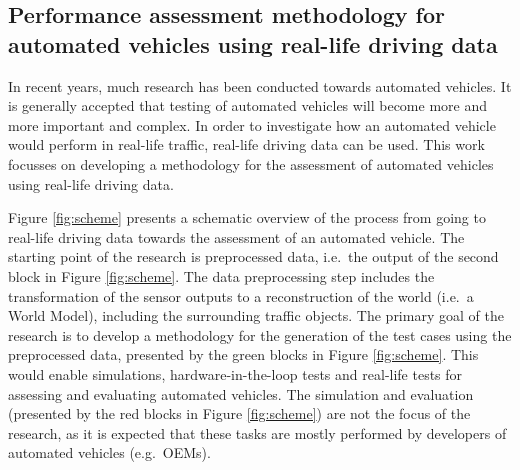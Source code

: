 \documentclass[10pt,final,a4paper,oneside,onecolumn]{article}
\begin{document}
\subsection*{Performance assessment methodology for automated vehicles using real-life driving data}

In recent years, much research has been conducted towards automated vehicles. It is generally accepted that testing of automated vehicles will become more and more important and complex. In order to investigate how an automated vehicle would perform in real-life traffic, real-life driving data can be used. This work focusses on developing a methodology for the assessment of automated vehicles using real-life driving data.

Figure \ref{fig:scheme} presents a schematic overview of the process from going to real-life driving data towards the assessment of an automated vehicle. The starting point of the research is preprocessed data, i.e.\ the output of the second block in Figure \ref{fig:scheme}. The data preprocessing step includes the transformation of the sensor outputs to a reconstruction of the world (i.e.\ a World Model), including the surrounding traffic objects. The primary goal of the research is to develop a methodology for the generation of the test cases using the preprocessed data, presented by the green blocks in Figure \ref{fig:scheme}. This would enable simulations, hardware-in-the-loop tests and real-life tests for assessing and evaluating automated vehicles. The simulation and evaluation (presented by the red blocks in Figure \ref{fig:scheme}) are not the focus of the research, as it is expected that these tasks are mostly performed by developers of automated vehicles (e.g.\ OEMs).
\end{document}
